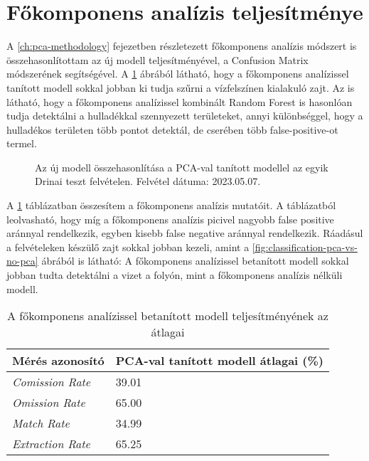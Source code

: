 \section{Főkomponens analízis teljesítménye}
\label{ch:pca-performance}

A \ref{ch:pca-methodology} fejezetben részletezett főkomponens analízis módszert is összehasonlítottam az új modell teljesítményével, a Confusion Matrix módszerének segítségével. A \ref{fig:pca-vs-no-pca} ábrából látható, hogy a főkomponens analízissel tanított modell sokkal jobban ki tudja szűrni a vízfelszínen kialakuló zajt. Az is látható, hogy a főkomponens analízissel kombinált Random Forest is hasonlóan tudja detektálni a hulladékkal szennyezett területeket, annyi különbséggel, hogy a hulladékos területen több pontot detektál, de cserében több false-positive-ot termel.

\begin{figure}[H]
	\centering
	\hspace{5pt}
	\hspace{5pt}
	\caption{Az új modell összehasonlítása a PCA-val tanított modellel az egyik Drinai teszt felvételen. Felvétel dátuma: 2023.05.07.}
	\label{fig:pca-vs-no-pca}
\end{figure}

A \ref{tab:pca-vs-no-pca} táblázatban összesítem a főkomponens analízis mutatóit. A táblázatból leolvasható, hogy míg a főkomponens analízis picivel nagyobb false positive aránnyal rendelkezik, egyben kisebb false negative aránnyal rendelkezik. Ráadásul a felvételeken készülő zajt sokkal jobban kezeli, amint a \ref{fig:classification-pca-vs-no-pca} ábrából is látható: A főkomponens analízissel betanított modell sokkal jobban tudta detektálni a vizet a folyón, mint a főkomponens analízis nélküli modell.

\begin{table}[H]
	\centering
	\begin{tabular}{ | p{} | p{} | }
		\hline
		\textbf{Mérés azonosító} & \textbf{PCA-val tanított modell átlagai (\%)} \\
		\hline \hline
		\emph{Comission Rate} & 39.01 \\
		\hline
		\emph{Omission Rate} & 65.00 \\
		\hline
		\emph{Match Rate} & 34.99  \\
		\hline
        \emph{Extraction Rate} & 65.25 \\
		\hline
	\end{tabular}
	\caption{A főkomponens analízissel betanított modell teljesítményének az átlagai}
	\label{tab:pca-vs-no-pca}
\end{table}

